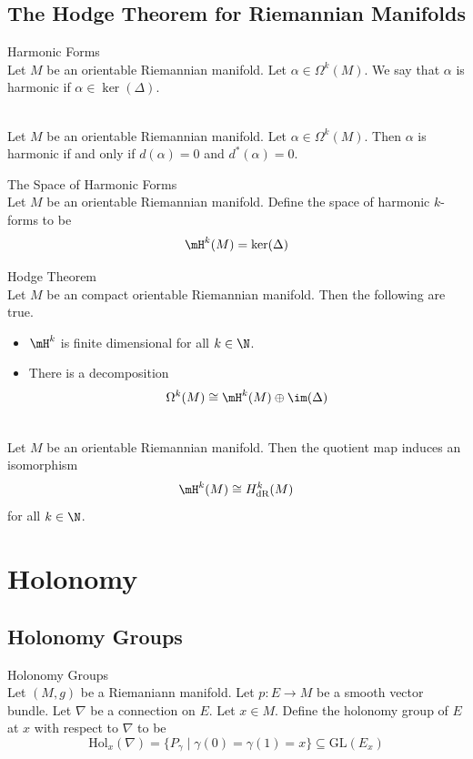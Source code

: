 \documentclass[a4paper]{article}
\begin{document}
\subsection{The Hodge Theorem for Riemannian Manifolds}
\begin{defn}{Harmonic Forms}{}\\
Let $M$ be an orientable Riemannian manifold. Let $\alpha\in\Omega^k(M)$. We say that $\alpha$ is harmonic if $\alpha\in\ker(\Delta)$. 
\end{defn}

\begin{lmm}{}{}\\
Let $M$ be an orientable Riemannian manifold. Let $\alpha\in\Omega^k(M)$. Then $\alpha$ is harmonic if and only if $d(\alpha)=0$ and $d^\ast(\alpha)=0$. 
\end{lmm}

\begin{defn}{The Space of Harmonic Forms}{}\\
Let $M$ be an orientable Riemannian manifold. Define the space of harmonic $k$-forms to be $$\mH^k(M)=\ker(\Delta)$$
\end{defn}

\begin{thm}{Hodge Theorem}{}\\
Let $M$ be an compact orientable Riemannian manifold. Then the following are true. 
\begin{itemize}
\item $\mH^k$ is finite dimensional for all $k\in\N$. 
\item There is a decomposition $$\Omega^k(M)\cong\mH^k(M)\oplus\im(\Delta)$$
\end{itemize}
\end{thm}

\begin{crl}{}{}\\
Let $M$ be an orientable Riemannian manifold. Then the quotient map induces an isomorphism $$\mH^k(M)\cong H_\text{dR}^k(M)$$ for all $k\in\N$. 
\end{crl}

\pagebreak
\section{Holonomy}
\subsection{Holonomy Groups}
\begin{defn}{Holonomy Groups}{}\\
Let $(M,g)$ be a Riemaniann manifold. Let $p:E\to M$ be a smooth vector bundle. Let $\nabla$ be a connection on $E$. Let $x\in M$. Define the holonomy group of $E$ at $x$ with respect to $\nabla$ to be $$\text{Hol}_x(\nabla)=\{P_\gamma\;|\;\gamma(0)=\gamma(1)=x\}\subseteq\text{GL}(E_x)$$
\end{defn}
\end{document}
